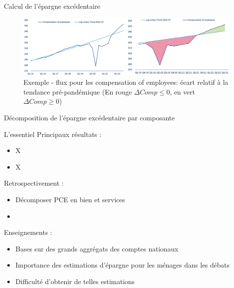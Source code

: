\documentclass[9pt, xcolor={dvipsnames}]{beamer}
\begin{document}
\begin{frame}{Calcul de l'épargne excédentaire}
  \begin{figure}
    \centering
    \includegraphics[width=1\textwidth]{img/excess_chart.png}
    \caption{Exemple - flux pour les compensation of employees: écart relatif à la tendance pré-pandémique (En rouge $\Delta Comp \leq 0$, en vert $\Delta Comp \geq  0$)}
  \end{figure}
\end{frame}

\begin{frame}{Décomposition de l'épargne excédentaire par composante}
\end{frame}

\begin{frame}{L'essentiel}
  Principaux résultats :
  \begin{itemize}
    \item X
    \item X
  \end{itemize}
  \vspace{.2cm}
  Retrospectivement :
  \begin{itemize}
    \item Décomposer PCE en bien et services
    \item 
  \end{itemize}
  \vspace{.2cm}
  Enseignements :
  \begin{itemize}
    \item Bases sur des grands aggrégats des comptes nationaux
    \item Importance des estimations d'épargne pour les ménages dans les débats  
    \item Difficulté d'obtenir de telles estimations
  \end{itemize}
\end{frame}

\end{document}
